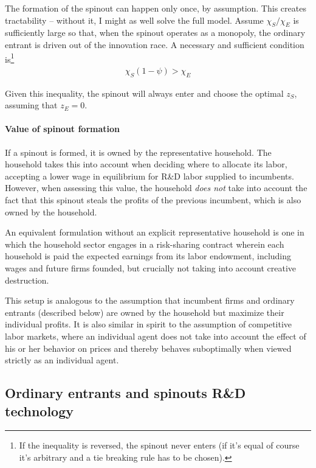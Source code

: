 \documentclass[12pt,english]{article}
\theoremstyle{remark}
\begin{document}
The formation of the spinout can happen only once, by assumption. This creates tractability -- without it, I might as well solve the full model. Assume $\chi_S / \chi_E$ is sufficiently large so that, when the spinout operates as a monopoly, the ordinary entrant is driven out of the innovation race. A necessary and sufficient condition is\footnote{If the inequality is reversed, the spinout never enters (if it's equal of course it's arbitrary and a tie breaking rule has to be chosen).}
\begin{align}
	\chi_S(1-\psi) > \chi_E
\end{align}

Given this inequality, the spinout will always enter and choose the optimal $z_S$, assuming that $z_E = 0$. 


\paragraph{Value of spinout formation}

If a spinout is formed, it is owned by the representative household. The household takes this into account when deciding where to allocate its labor, accepting a lower wage in equilibrium for R\&D labor supplied to incumbents. However, when assessing this value, the household \textit{does not} take into account the fact that this spinout steals the profits of the previous incumbent, which is also owned by the household. 

An equivalent formulation without an explicit representative household is one in which the household sector engages in a risk-sharing contract wherein each household is paid the expected earnings from its labor endowment, including wages and future firms founded, but crucially not taking into account creative destruction.  

This setup is analogous to the assumption that incumbent firms and ordinary entrants (described below) are owned by the household but maximize their individual profits. It is also similar in spirit to the assumption of competitive labor markets, where an individual agent does not take into account the effect of his or her behavior on prices and thereby behaves suboptimally when viewed strictly as an individual agent. 


\subsection{Ordinary entrants and spinouts R\&D technology}\label{subsec_ordinaryEntrants}
\end{document}
